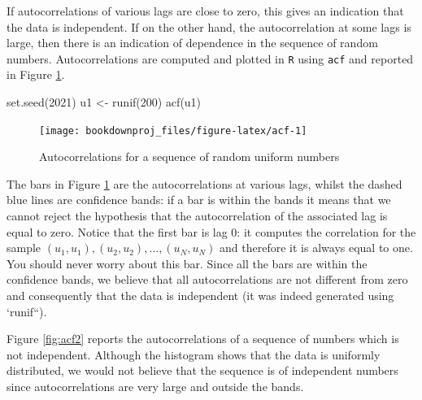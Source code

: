 \documentclass[
]{book}
\newenvironment{Shaded}{\begin{snugshade}}{\end{snugshade}}
\newcommand{\DecValTok}[1]{\textcolor[rgb]{0.00,0.00,0.81}{#1}}
\newcommand{\FunctionTok}[1]{\textcolor[rgb]{0.00,0.00,0.00}{#1}}
\newcommand{\NormalTok}[1]{#1}
\newcommand{\OtherTok}[1]{\textcolor[rgb]{0.56,0.35,0.01}{#1}}
\theoremstyle{definition}
\theoremstyle{definition}
\theoremstyle{definition}
\theoremstyle{definition}
\theoremstyle{remark}
\begin{document}
If autocorrelations of various lags are close to zero, this gives an indication that the data is independent. If on the other hand, the autocorrelation at some lags is large, then there is an indication of dependence in the sequence of random numbers. Autocorrelations are computed and plotted in \texttt{R} using \texttt{acf} and reported in Figure \ref{fig:acf}.

\begin{Shaded}
\begin{Highlighting}[]
\FunctionTok{set.seed}\NormalTok{(}\DecValTok{2021}\NormalTok{)}
\NormalTok{u1 }\OtherTok{\textless{}{-}} \FunctionTok{runif}\NormalTok{(}\DecValTok{200}\NormalTok{)}
\FunctionTok{acf}\NormalTok{(u1)}
\end{Highlighting}
\end{Shaded}

\begin{figure}

{\centering \texttt{[image: bookdownproj\_files/figure-latex/acf-1]} 

}

\caption{Autocorrelations for a sequence of random uniform numbers}\label{fig:acf}
\end{figure}

The bars in Figure \ref{fig:acf} are the autocorrelations at various lags, whilst the dashed blue lines are confidence bands: if a bar is within the bands it means that we cannot reject the hypothesis that the autocorrelation of the associated lag is equal to zero. Notice that the first bar is lag 0: it computes the correlation for the sample \((u_1,u_1),(u_2,u_2),\dots,(u_N,u_N)\) and therefore it is always equal to one. You should never worry about this bar. Since all the bars are within the confidence bands, we believe that all autocorrelations are not different from zero and consequently that the data is independent (it was indeed generated using `runif``).

Figure \ref{fig:acf2} reports the autocorrelations of a sequence of numbers which is not independent. Although the histogram shows that the data is uniformly distributed, we would not believe that the sequence is of independent numbers since autocorrelations are very large and outside the bands.
\end{document}
